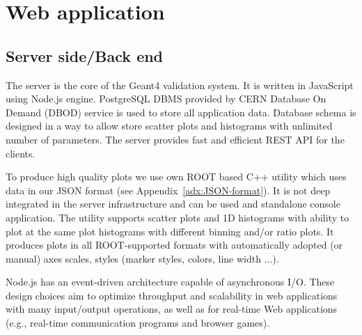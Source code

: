 \section{Web application}
\label{sec-webapplication}

\subsection{Server side/Back end}
\label{sec-webapplication-server}

The server is the core of the Geant4 validation system.
It is written in JavaScript using Node.js engine. PostgreSQL DBMS provided by CERN Database On Demand (DBOD) service is used to store all application data. Database schema is designed in a way to allow store scatter plots and histograms with unlimited number of parameters. The server provides fast and efficient REST API for the clients.

To produce high quality plots we use own ROOT based C++ utility which uses data in our JSON format (see Appendix~\ref{adx:JSON-format}). It is not deep integrated in the server infrastructure and can be used and standalone console application. The utility supports scatter plots and 1D histograms with ability to plot at the same plot histograms with different binning and/or ratio plots. It produces plots in all ROOT-supported formats with automatically adopted (or manual) axes scales, styles (marker styles, colors, line width ...). 


Node.js has an event-driven architecture capable of asynchronous I/O. These design choices aim to optimize throughput and scalability in web applications with many input/output operations, as well as for real-time Web applications (e.g., real-time communication programs and browser games).

